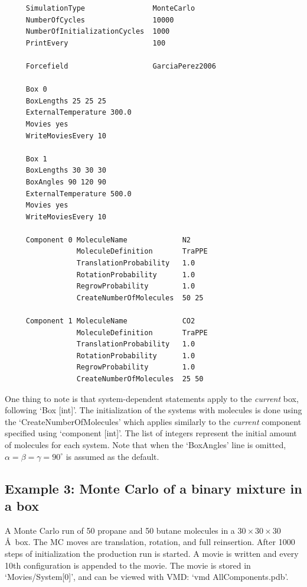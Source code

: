 \begin{tiny}
\begin{verbatim}
     SimulationType                MonteCarlo
     NumberOfCycles                10000
     NumberOfInitializationCycles  1000
     PrintEvery                    100
     
     Forcefield                    GarciaPerez2006
     
     Box 0
     BoxLengths 25 25 25
     ExternalTemperature 300.0
     Movies yes
     WriteMoviesEvery 10
     
     Box 1
     BoxLengths 30 30 30
     BoxAngles 90 120 90
     ExternalTemperature 500.0
     Movies yes
     WriteMoviesEvery 10
     
     Component 0 MoleculeName             N2
                 MoleculeDefinition       TraPPE
                 TranslationProbability   1.0
                 RotationProbability      1.0
                 RegrowProbability        1.0
                 CreateNumberOfMolecules  50 25
     
     Component 1 MoleculeName             CO2
                 MoleculeDefinition       TraPPE
                 TranslationProbability   1.0
                 RotationProbability      1.0
                 RegrowProbability        1.0
                 CreateNumberOfMolecules  25 50
\end{verbatim}
\end{tiny}
One thing to note is that system-dependent statements apply to the \emph{current} box, following `Box [int]'. The initialization
of the systems with molecules is done using the `CreateNumberOfMolecules' which applies similarly to the \emph{current} component
specified using `component [int]'. The list of integers represent the initial amount of molecules for each system. Note that when the
`BoxAngles' line is omitted, $\alpha=\beta=\gamma=90^\circ$ is assumed as the default.


\subsection*{Example 3: Monte Carlo of a binary mixture in a box}
A Monte Carlo run of 50 propane and 50 butane molecules in a $30\times30\times30$ \AA\ box. The MC moves are
translation, rotation, and full reinsertion.
After 1000 steps of initialization the production run is started.
A movie is written and every 10th configuration is appended to the movie. 
The movie is stored in `Movies/System[0]',
and can be viewed with VMD: `vmd AllComponents.pdb'.

